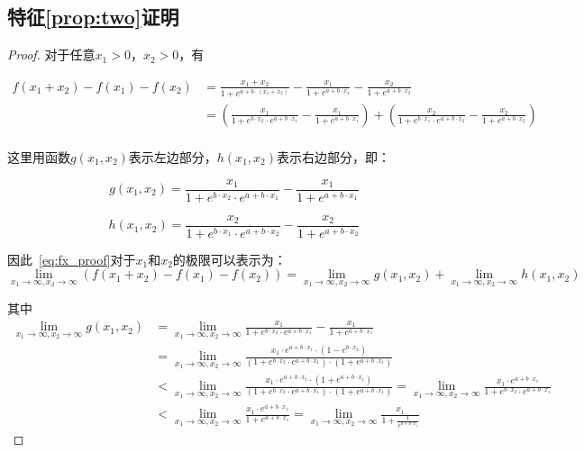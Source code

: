 \subsection{特征\ref{prop:two}证明}
\begin{proof}
对于任意$x_1>0$，$x_2>0$，有

\begin{equation}
\label{eq:fx_proof}
\begin{aligned}
f(x_1+x_2)-f(x_1)-f(x_2)&=\frac{x_1+x_2}{1+e^{a+b\cdot (x_1+x_2)}}-\frac{x_1}{1+e^{a+b\cdot x_1}}-\frac{x_2}{1+e^{a+b\cdot x_2}}\\
&=(\frac{x_1}{1+e^{b\cdot x_2}\cdot e^{a+b\cdot {x_1}}}-\frac{x_1}{1+e^{a+b\cdot x_1}})+(\frac{x_2}{1+e^{b\cdot x_1}\cdot e^{a+b\cdot {x_2}}}-\frac{x_2}{1+e^{a+b\cdot x_2}})\\
\end{aligned}
\end{equation}

这里用函数$g(x_1,x_2)$表示左边部分，$h(x_1,x_2)$表示右边部分，即：

\begin{equation}
\label{eq:gx_func_proof}
g(x_1,x_2)=\frac{x_1}{1+e^{b\cdot x_2}\cdot e^{a+b\cdot {x_1}}}-\frac{x_1}{1+e^{a+b\cdot x_1}}
\end{equation}

\begin{equation}
\label{eq:hx_func_proof}
h(x_1,x_2)=\frac{x_2}{1+e^{b\cdot x_1}\cdot e^{a+b\cdot {x_2}}}-\frac{x_2}{1+e^{a+b\cdot x_2}}
\end{equation}

因此~\eqref{eq:fx_proof}对于$x_1$和$x_2$的极限可以表示为：
\[
\lim_{x_1 \to \infty,x_2\to \infty}(f(x_1+x_2)-f(x_1)-f(x_2))=\lim_{x_1 \to \infty,x_2\to \infty}g(x_1,x_2)+\lim_{x_1 \to \infty,x_2\to \infty}h(x_1,x_2)
\]

其中
\[
\begin{aligned}
\lim_{x_1 \to \infty,x_2\to \infty}g(x_1,x_2)&=\lim_{x_1 \to \infty,x_2\to \infty}\frac{x_1}{1+e^{b\cdot x_2}\cdot e^{a+b\cdot {x_1}}}-\frac{x_1}{1+e^{a+b\cdot x_1}}\\
&=\lim_{x_1 \to \infty,x_2\to \infty}\frac{x_1\cdot e^{a+b\cdot x_1}\cdot(1-e^{b\cdot x_2})}{(1+e^{b\cdot x_2}\cdot e^{a+b\cdot x_1})\cdot(1+e^{a+b\cdot x_1})}\\
&<\lim_{x_1 \to \infty,x_2\to \infty}\frac{x_1\cdot e^{a+b\cdot x_1}\cdot(1+e^{a+b\cdot x_1})}{(1+e^{b\cdot x_2}\cdot e^{a+b\cdot x_1})\cdot(1+e^{a+b\cdot x_1})}=\lim_{x_1 \to \infty,x_2\to \infty}\frac{x_1\cdot e^{a+b\cdot x_1}}{1+e^{b\cdot x_2}\cdot e^{a+b\cdot x_1}}\\
&<\lim_{x_1 \to \infty,x_2\to \infty}\frac{x_1\cdot e^{a+b\cdot x_1}}{1+e^{a+b\cdot x_1}}=\lim_{x_1 \to \infty,x_2\to \infty}\frac{x_1}{1+\frac{1}{e^{a+b\cdot x_1}}}


\end{aligned}\]
\end{proof}
